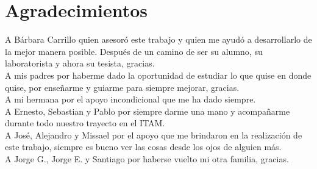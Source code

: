 \documentclass[11pt, oneside]{book}
\begin{document}
\chapter*{Agradecimientos}

\noindent A Bárbara Carrillo quien asesoró este trabajo y quien me ayudó a desarrollarlo de la mejor manera posible. Después de un camino de ser su alumno, su laboratorista y ahora su tesista, gracias. \\

\noindent A mis padres por haberme dado la oportunidad de estudiar lo que quise en donde quise, por enseñarme y guiarme para siempre mejorar, gracias. \\

\noindent A mi hermana por el apoyo incondicional que me ha dado siempre. \\

\noindent A Ernesto, Sebastian y Pablo por siempre darme una mano y acompañarme durante todo nuestro trayecto en el ITAM. \\

\noindent A José, Alejandro y Missael por el apoyo que me brindaron en la realización de este trabajo, siempre es bueno ver las cosas desde los ojos de alguien más. \\

\noindent A Jorge G., Jorge E. y Santiago por haberse vuelto mi otra familia, gracias.





\tableofcontents


\listoftables

\listoffigures

\end{document}

